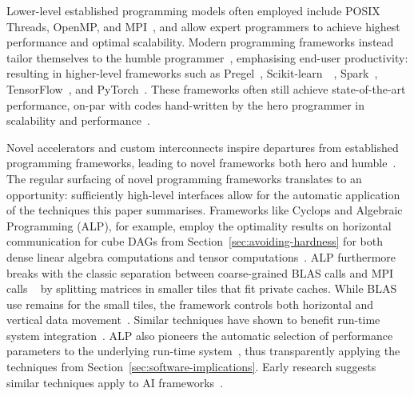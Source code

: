 \documentclass[oneside,reqno, a4paper]{amsart}
\numberwithin{equation}{section}
\begin{document}
Lower-level established programming models often employed %
include
POSIX Threads, OpenMP, and MPI~\cite{pthreads_latest,openmp_latest,mpi_latest},
and allow expert programmers to achieve highest performance and optimal scalability.
Modern programming frameworks instead tailor themselves to the humble programmer~\cite{dijkstra72},
emphasising end-user productivity:
resulting in higher-level frameworks such as
Pregel~\cite{malewicz10,ching15},
Scikit-learn~~\cite{pedregosa11},
Spark~\cite{zaharia16},
TensorFlow~\cite{abadi16}, and
PyTorch~\cite{paszke19}.
These frameworks often still achieve state-of-the-art performance,
on-par with codes hand-written by the hero programmer in scalability and performance~\cite{yzelman22}.

Novel accelerators and custom interconnects
inspire departures from established programming frameworks,
leading to novel frameworks both hero and humble~\cite{suijlen19,tillet19,yzelman20, ALP_website,wang25,cutile_latest,pypto_gitcode}.
The regular surfacing of novel programming frameworks translates to an opportunity:
sufficiently high-level interfaces allow for the automatic application of the techniques this paper summarises.
Frameworks like Cyclops and Algebraic Programming (ALP),
for example,
employ the optimality results on horizontal communication for cube DAGs from Section~\ref{sec:avoiding-hardness}
for both dense linear algebra computations and tensor computations~\cite{solomonik13,spampinato23a}.
ALP furthermore breaks with the classic separation between coarse-grained BLAS calls and MPI calls%
~\cite{choi92}
by splitting matrices in smaller tiles that fit private caches.
While BLAS use remains for the small tiles,
the framework controls both horizontal and vertical data movement~\cite{mastoras22a,spampinato23a}.
Similar techniques have shown to benefit run-time system integration~\cite{dongarra13}.
ALP also pioneers the automatic selection of performance parameters to the underlying run-time system~\cite{mastoras22a,anastasiadis26a},
thus transparently applying the techniques from Section~\ref{sec:software-implications}.
Early research suggests similar techniques apply to AI frameworks~\cite{georganas21}.
\end{document}
